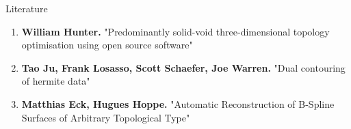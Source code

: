 \begin{frame}{Literature}
\begin{enumerate}
\item \textbf{William Hunter.} "Predominantly solid-void three-dimensional topology optimisation using open source software"
\item \textbf{Tao Ju, Frank Losasso, Scott Schaefer, Joe Warren.} "Dual contouring of hermite data"
\item \textbf{Matthias Eck, Hugues Hoppe.} "Automatic Reconstruction of B-Spline Surfaces of Arbitrary Topological Type"
\end{enumerate}
\end{frame}
